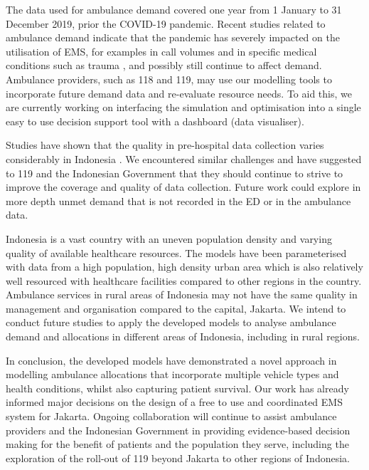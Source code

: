 \documentclass[preprint,12pt]{elsarticle}
\begin{document}
The data used for ambulance demand covered one year from 1 January to 31
December 2019, prior the COVID-19 pandemic. Recent studies related to
ambulance demand indicate that the  pandemic has severely impacted on the
utilisation of EMS, for examples in call volumes \cite{csan2021effects} and in
specific medical conditions such as trauma \cite{ azbel2021effects}, and
possibly still continue to affect demand. Ambulance providers, such as 118 and
119, may use our modelling tools to incorporate future demand data and
re-evaluate resource needs. To aid this, we are currently working on
interfacing the simulation and optimisation into a single easy to use decision
support tool with a dashboard (data visualiser). 

Studies have shown that the quality in pre-hospital data collection varies
considerably in Indonesia \cite{hooper2019_datacollection}. We encountered
similar challenges and have suggested to 119 and the Indonesian Government
that they should continue to strive to improve the coverage and quality of
data collection. Future work could explore in more depth unmet demand that is
not recorded in the ED or in the ambulance data.

Indonesia is a vast country with an uneven population density and varying
quality of available healthcare resources. The models have been parameterised
with data from a high population, high density urban area which is also
relatively well resourced with healthcare facilities compared to other regions
in the country. Ambulance services in rural areas of Indonesia may not have
the same quality in management and organisation compared to the capital,
Jakarta. We intend to conduct future studies to apply the developed models to
analyse ambulance demand and allocations in different areas of Indonesia,
including in rural regions.

In conclusion, the developed models have demonstrated a novel approach in
modelling ambulance allocations that incorporate multiple vehicle types and
health conditions, whilst also capturing patient survival. Our work has
already informed major decisions on the design of a free to use and
coordinated EMS system for Jakarta. Ongoing collaboration will continue to
assist ambulance providers and the Indonesian Government in providing
evidence-based decision making for the benefit of patients and the population
they serve, including the exploration of the roll-out of 119 beyond Jakarta to
other regions of Indonesia. 
\end{document}
